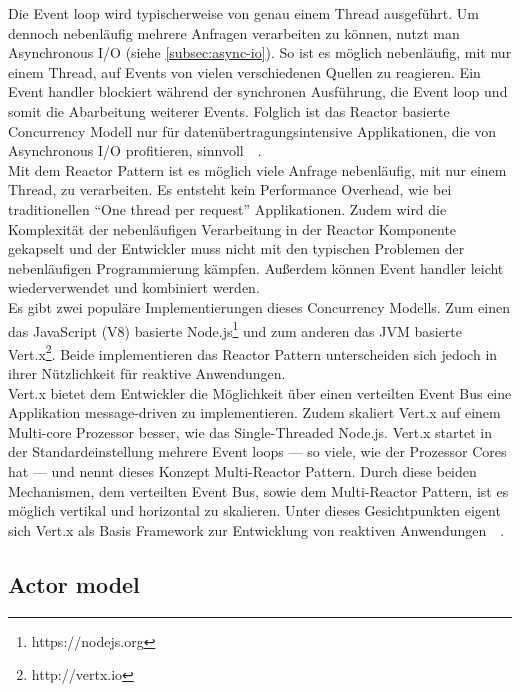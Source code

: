 Die Event loop wird typischerweise von genau einem Thread ausgeführt. Um dennoch nebenläufig mehrere Anfragen verarbeiten zu können, nutzt man Asynchronous I/O (siehe \ref{subsec:async-io}). So ist es möglich nebenläufig, mit nur einem Thread, auf Events von vielen verschiedenen Quellen zu reagieren. Ein Event handler blockiert während der synchronen Ausführung, die Event loop und somit die Abarbeitung weiterer Events. Folglich ist das Reactor basierte Concurrency Modell nur für datenübertragungsintensive Applikationen, die von Asynchronous I/O profitieren, sinnvoll~\cite[S.~73]{kuhn_reactive_2015}~\cite[S.~92]{erb_concurrent_2012}.\\
Mit dem Reactor Pattern ist es möglich viele Anfrage nebenläufig, mit nur einem Thread, zu verarbeiten. Es entsteht kein Performance Overhead, wie bei traditionellen \enquote{One thread per request} Applikationen. Zudem wird die Komplexität der nebenläufigen Verarbeitung in der Reactor Komponente gekapselt und der Entwickler muss nicht mit den typischen Problemen der nebenläufigen Programmierung kämpfen. Außerdem können Event handler leicht wiederverwendet und kombiniert werden.\\
Es gibt zwei populäre Implementierungen dieses Concurrency Modells. Zum einen das JavaScript (V8) basierte Node.js\footnote{https://nodejs.org} und zum anderen das JVM basierte Vert.x\footnote{http://vertx.io}. Beide implementieren das Reactor Pattern unterscheiden sich jedoch in ihrer Nützlichkeit für reaktive Anwendungen.\\
Vert.x bietet dem Entwickler die Möglichkeit über einen verteilten Event Bus eine Applikation message-driven zu implementieren. Zudem skaliert Vert.x auf einem Multi-core Prozessor besser, wie das Single-Threaded Node.js. Vert.x startet in der Standardeinstellung mehrere Event loops --- so viele, wie der Prozessor Cores hat --- und nennt dieses Konzept Multi-Reactor Pattern. Durch diese beiden Mechanismen, dem verteilten Event Bus, sowie dem Multi-Reactor Pattern, ist es möglich vertikal und horizontal zu skalieren. Unter dieses Gesichtpunkten eigent sich Vert.x als Basis Framework zur Entwicklung von reaktiven Anwendungen~\cite[S.~74]{kuhn_reactive_2015}~\cite[S.~93~\&~S.~94]{erb_concurrent_2012}.

\pagebreak

\subsection{Actor model}

